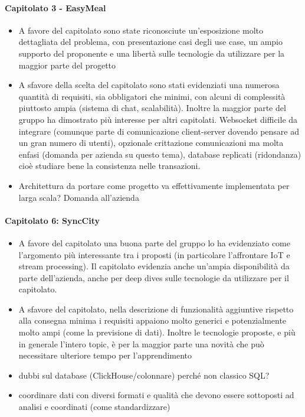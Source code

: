 \paragraph{Capitolato 3 - EasyMeal}
\begin{itemize}
	\item A favore del capitolato sono state riconosciute un’esposizione molto dettagliata del problema, con presentazione casi degli use case, un ampio supporto del proponente e una libertà sulle tecnologie da utilizzare per la maggior parte del progetto
	\item A sfavore della scelta del capitolato sono stati evidenziati una numerosa quantità di requisiti, sia obbligatori che minimi, con alcuni di complessità piuttosto ampia (sistema di chat, scalabilità). Inoltre la maggior parte del gruppo ha dimostrato più interesse per altri capitolati. Websocket difficile da integrare (comunque parte di comunicazione client-server dovendo pensare ad un gran numero di utenti), opzionale crittazione comunicazioni ma molta enfasi (domanda per azienda su questo tema), database replicati (ridondanza) cioè studiare bene la consistenza nelle transazioni.
	\item Architettura da portare come progetto va effettivamente implementata per larga scala? Domanda all’azienda
\end{itemize}

\paragraph{Capitolato 6: SyncCity}
\begin{itemize}
	\item A favore del capitolato una buona parte del gruppo lo ha evidenziato come l’argomento più interessante tra i proposti (in particolare l’affrontare IoT e stream processing). Il capitolato evidenzia anche un’ampia disponibilità da parte dell’azienda, anche per deep dives sulle tecnologie da utilizzare per il capitolato.
	\item A sfavore del capitolato, nella descrizione di funzionalità aggiuntive rispetto alla consegna minima i requisiti appaiono molto generici e potenzialmente molto ampi (come la previsione di dati). Inoltre le tecnologie proposte, e più in generale l’intero topic, è per la maggior parte una novità che può necessitare ulteriore tempo per l’apprendimento
	\item dubbi sul database (ClickHouse/colonnare) perché non classico SQL?
	\item coordinare dati con diversi formati e qualità che devono essere sottoposti ad analisi e coordinati (come standardizzare)
\end{itemize}

